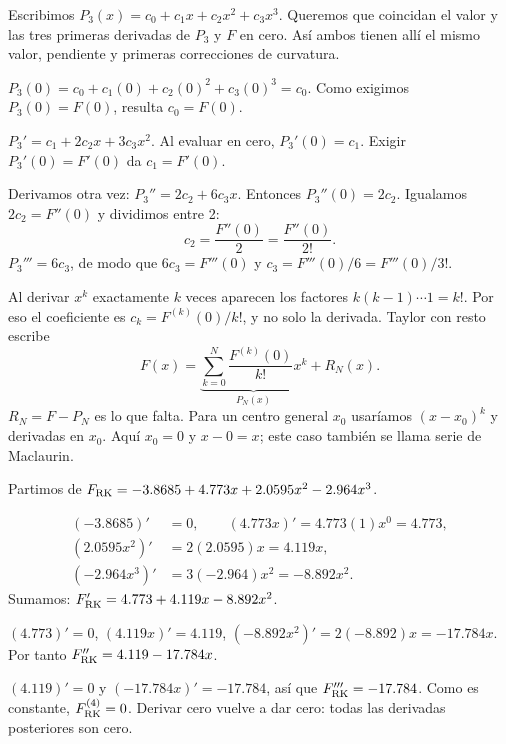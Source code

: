 Escribimos $P_3(x)=c_0+c_1x+c_2x^2+c_3x^3$. Queremos que coincidan el valor y las tres primeras derivadas de $P_3$ y $F$ en cero. Así ambos tienen allí el mismo valor, pendiente y primeras correcciones de curvatura.

$P_3(0)=c_0+c_1(0)+c_2(0)^2+c_3(0)^3=c_0$. Como exigimos $P_3(0)=F(0)$, resulta $c_0=F(0)$.

$P_3'=c_1+2c_2x+3c_3x^2$. Al evaluar en cero, $P_3'(0)=c_1$. Exigir $P_3'(0)=F'(0)$ da $c_1=F'(0)$.

Derivamos otra vez: $P_3''=2c_2+6c_3x$. Entonces $P_3''(0)=2c_2$. Igualamos $2c_2=F''(0)$ y dividimos entre 2:
\[
c_2=\frac{F''(0)}2=\frac{F''(0)}{2!}.
\]
$P_3'''=6c_3$, de modo que $6c_3=F'''(0)$ y $c_3=F'''(0)/6=F'''(0)/3!$.

Al derivar $x^k$ exactamente $k$ veces aparecen los factores $k(k-1)\cdots1=k!$. Por eso el coeficiente es $c_k=F^{(k)}(0)/k!$, y no solo la derivada. Taylor con resto escribe
\[
F(x)=\underbrace{\sum_{k=0}^{N}\frac{F^{(k)}(0)}{k!}x^k}_{P_N(x)}+R_N(x).
\]
$R_N=F-P_N$ es lo que falta. Para un centro general $x_0$ usaríamos $(x-x_0)^k$ y derivadas en $x_0$. Aquí $x_0=0$ y $x-0=x$; este caso también se llama serie de Maclaurin.


Partimos de $F_{\mathrm{RK}}=-3.8685+4.773x+2.0595x^2-2.964x^3$.

\begin{align*}
(-3.8685)'&=0,\qquad (4.773x)'=4.773(1)x^0=4.773,\\
(2.0595x^2)'&=2(2.0595)x=4.119x,\\
(-2.964x^3)'&=3(-2.964)x^2=-8.892x^2.
\end{align*}
Sumamos: $F_{\mathrm{RK}}'=4.773+4.119x-8.892x^2$.

$(4.773)'=0$, $(4.119x)'=4.119$, $(-8.892x^2)'=2(-8.892)x=-17.784x$. Por tanto $F_{\mathrm{RK}}''=4.119-17.784x$.

$(4.119)'=0$ y $(-17.784x)'=-17.784$, así que $F_{\mathrm{RK}}'''=-17.784$. Como es constante, $F_{\mathrm{RK}}^{(4)}=0$. Derivar cero vuelve a dar cero: todas las derivadas posteriores son cero.

